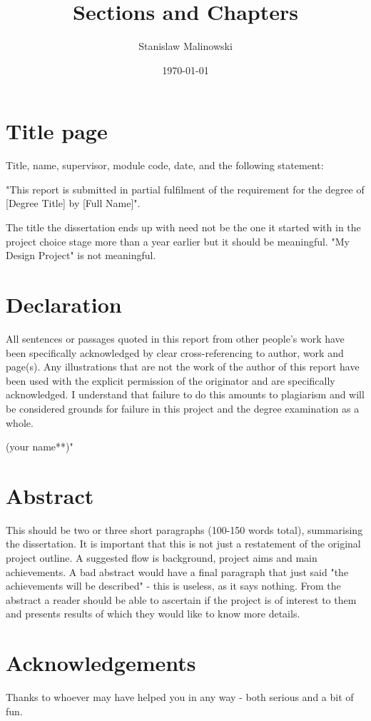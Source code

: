\documentclass{article}
\title{Sections and Chapters}
\author{Stanislaw Malinowski}
\date{\today}
\begin{document}
\maketitle
\section{Title page}
Title, name, supervisor, module code, date, and the following statement:    

"This report is submitted in partial fulfilment of the requirement for the degree of [Degree Title] by [Full Name]".   

The title the dissertation ends up with need not be the one it started with in the project choice stage more than a year earlier but it should be meaningful.  "My Design Project" is not meaningful.
\blindtext
\newpage

\section{Declaration}
All sentences or passages quoted in this report from other people's work have been specifically acknowledged by clear cross-referencing to author, work and page(s). Any illustrations that are not the work of the author of this report have been used with the explicit permission of the originator and are specifically acknowledged. I understand that failure to do this amounts to plagiarism and will be considered grounds for failure in this project and the degree examination as a whole.

(your name**)"
\blindtext
\newpage

\section{Abstract}
This should be two or three short paragraphs (100-150 words total), summarising the dissertation. It is important that this is not just a restatement of the original project outline. A suggested flow is background, project aims and main achievements. A bad abstract would have a final paragraph that just said "the achievements will be described" - this is useless, as it says nothing. From the abstract a reader should be able to ascertain if the project is of interest to them and presents results of which they would like to know more details.
\blindtext
\newpage

\section{Acknowledgements}
Thanks to whoever may have helped you in any way - both serious and a bit of fun.
\blindtext
\end{document}
